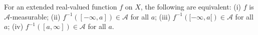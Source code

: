 For an extended real-valued function $f$ on $X$, the following are equivalent: (i) $f$ is $\mathcal{A}$-measurable; (ii) $f^{-1}([-\infty, a]) \in \mathcal{A}$ for all $a$; (iii) $f^{-1}([-\infty, a[) \in \mathcal{A}$ for all $a$; (iv) $f^{-1}([a, \infty]) \in \mathcal{A}$ for all $a$.
